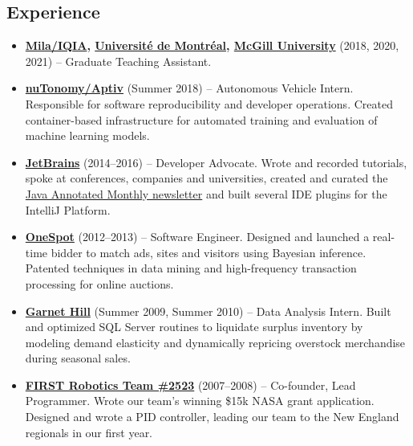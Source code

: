 \documentclass[letterpaper,11pt]{article}
\newcommand{\resumeItem}[2]{
  \item\small{\textbf{#1}{ #2 }}
}
\newcommand{\resumeSubItem}[2]{\resumeItem{#1}{#2}}
\newcommand{\resumeSubHeadingListStart}{\begin{itemize}[leftmargin=*]}
\newcommand{\resumeSubHeadingListEnd}{\end{itemize}}
\begin{document}
\begin{justify}
\section{Experience}
\resumeSubHeadingListStart
\resumeSubItem{\href{https://mila.quebec/en/}{Mila/IQIA}, \href{https://www.umontreal.ca/}{Universit\'e de Montr\'eal}, \href{https://www.mcgill.ca/}{McGill University}}{(2018, 2020, 2021) -- Graduate Teaching Assistant.}
\resumeSubItem{\href{https://www.aptiv.com/}{nuTonomy/Aptiv}}{(Summer 2018) -- Autonomous Vehicle Intern. Responsible for software reproducibility and developer operations. Created container-based infrastructure for automated training and evaluation of machine learning models.}
\resumeSubItem{\href{https://www.jetbrains.com/}{JetBrains}}{(2014--2016) -- Developer Advocate. Wrote and recorded tutorials, spoke at conferences, companies and universities, created and curated the \href{https://blog.jetbrains.com/idea/tag/java-annotated/}{Java Annotated Monthly newsletter} and built several IDE plugins for the IntelliJ Platform.}
\resumeSubItem{\href{https://www.onespot.com/}{OneSpot}}{(2012--2013) -- Software Engineer. Designed and launched a real-time bidder to match ads, sites and visitors using Bayesian inference. Patented techniques in data mining and high-frequency transaction processing for online auctions.}
\resumeSubItem{\href{https://www.garnethill.com/}{Garnet Hill}}{(Summer 2009, Summer 2010) -- Data Analysis Intern. Built and optimized SQL Server routines to liquidate surplus inventory by modeling demand elasticity and dynamically repricing overstock merchandise during seasonal sales.}
\resumeSubItem{\href{https://www.firstinspires.org/}{FIRST Robotics Team \#2523}}{(2007--2008) -- Co-founder, Lead Programmer. Wrote our team's winning \$15k NASA grant application. Designed and wrote a PID controller, leading our team to the New England regionals in our first year.}
\resumeSubHeadingListEnd


\end{justify}
\end{document}
